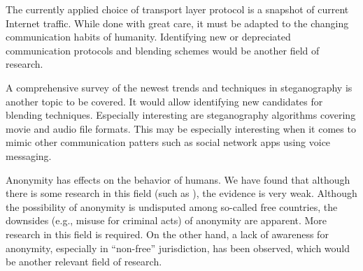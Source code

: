 The currently applied choice of transport layer protocol is a snapshot of current Internet traffic. While done with great care, it must be adapted to the changing communication habits of humanity. Identifying new or depreciated communication protocols and blending schemes would be another field of research.

A comprehensive survey of the newest trends and techniques in steganography is another topic to be covered. It would allow identifying new candidates for blending techniques. Especially interesting are steganography algorithms covering movie and audio file formats. This may be especially interesting when it comes to mimic other communication patters such as social network apps using voice messaging.

Anonymity has effects on the behavior of humans. We have found that although there is some research in this field (such as \cite{postmes2001social}), the evidence is very weak. Although the possibility of anonymity is undisputed among so-called free countries, the downsides (e.g., misuse for criminal acts) of anonymity are apparent. More research in this field is required. On the other hand, a lack of awareness for anonymity, especially in ``non-free'' jurisdiction, has been observed, which would be another relevant field of research. 
